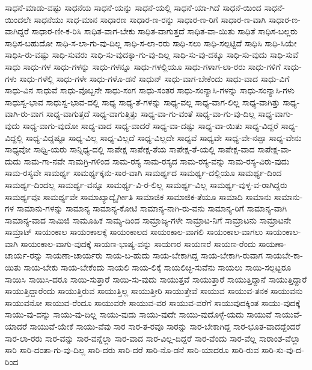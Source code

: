 {ಸಾಧನೆ-ಮಾಡು-ವಷ್ಟು
ಸಾಧನೆಯ
ಸಾಧನೆ-ಯನ್ನು
ಸಾಧನೆ-ಯಲ್ಲಿ
ಸಾಧನೆ-ಯಾ-ಗಿದೆ
ಸಾಧನೆ-ಯಿಂದ
ಸಾಧನೆ-ಯಿಂದಲೇ
ಸಾಧನೆಯು
ಸಾಧ-ಮಾನ
ಸಾಧಾರಣ
ಸಾಧಾರ-ಣ-ರನ್ನು
ಸಾಧಾರ-ಣ-ರಿಗೆ
ಸಾಧಾರ-ಣ-ವಾಗಿ
ಸಾಧಾರ-ಣ-ವಾಗಿದ್ದರೆ
ಸಾಧಾರ-ಣೀ-ಕ-ರಿಸಿ
ಸಾಧಿತ-ವಾಗ-ಬೇಕು
ಸಾಧಿತ-ವಾಗುತ್ತದೆ
ಸಾಧಿತ-ವಾ-ಯಿತು
ಸಾಧಿತೆ
ಸಾಧಿಸ-ಬಲ್ಲರು
ಸಾಧಿಸ-ಬಹುದೋ
ಸಾಧಿ-ಸ-ಲಾ-ಗು-ವು-ದಿಲ್ಲ
ಸಾಧಿ-ಸ-ಲಾ-ರರು
ಸಾಧಿ-ಸಲು
ಸಾಧಿ-ಸಲ್ಪಟ್ಟಿದೆ
ಸಾಧಿಸಿ
ಸಾಧಿ-ಸಿಯೇ
ಸಾಧಿಸಿ-ರು-ವಷ್ಟು
ಸಾಧಿ-ಸುವರು
ಸಾಧಿ-ಸು-ವುದಕ್ಕಾ-ಗು-ವು-ದಿಲ್ಲ
ಸಾಧಿ-ಸು-ವು-ದಕ್ಕೂ
ಸಾಧಿ-ಸು-ವುದು
ಸಾಧಿ-ಸುವೆ
ಸಾಧು
ಸಾಧು-ಗಳ
ಸಾಧು-ಗಳನ್ನು
ಸಾಧು-ಗಳನ್ನೂ
ಸಾಧು-ಗಳಲ್ಲಿಯೂ
ಸಾಧು-ಗಳಾಗ-ಲಾ-ರರು
ಸಾಧು-ಗಳಿಗೆ
ಸಾಧು-ಗಳು
ಸಾಧು-ಗಳೆಲ್ಲಿ
ಸಾಧು-ಗಳೇ
ಸಾಧು-ಗಳೊ-ಡನೆ
ಸಾಧುನ್
ಸಾಧು-ವಾಗ-ಬೇಕೆಂದು
ಸಾಧು-ವಾದ
ಸಾಧು-ವಿಗೆ
ಸಾಧು-ವಿನ
ಸಾಧುವೆ
ಸಾಧು-ವೊಬ್ಬನೇ
ಸಾಧು-ಸಂಗ
ಸಾಧು-ಸಂತರ
ಸಾಧು-ಸಂನ್ಯಾಸಿ-ಗಳನ್ನು
ಸಾಧು-ಸಂನ್ಯಾಸಿ-ಗಳು
ಸಾಧುಸ್ವ-ಭಾವ
ಸಾಧುಸ್ವ-ಭಾವ-ದಲ್ಲಿ
ಸಾಧ್ಯ
ಸಾಧ್ಯ-ತೆ-ಗಳನ್ನು
ಸಾಧ್ಯ-ವಲ್ಲ
ಸಾಧ್ಯ-ವಾಗ-ಲಿಲ್ಲ
ಸಾಧ್ಯ-ವಾಗಿತ್ತು
ಸಾಧ್ಯ-ವಾಗಿ-ರು-ವಾಗ
ಸಾಧ್ಯ-ವಾಗುತ್ತದೆ
ಸಾಧ್ಯ-ವಾಗುತ್ತಿತ್ತು
ಸಾಧ್ಯ-ವಾ-ಗು-ವಂತೆ
ಸಾಧ್ಯ-ವಾ-ಗು-ವು-ದಿಲ್ಲ
ಸಾಧ್ಯ-ವಾಗು-ವುದು
ಸಾಧ್ಯ-ವಾಗು-ವುದೋ
ಸಾಧ್ಯ-ವಾದ
ಸಾಧ್ಯ-ವಾದರೆ
ಸಾಧ್ಯ-ವಾ-ದಷ್ಟು
ಸಾಧ್ಯ-ವಾ-ಯಿತು
ಸಾಧ್ಯ-ವಿದ್ದರೆ
ಸಾಧ್ಯ-ವಿದ್ದಲ್ಲಿ
ಸಾಧ್ಯ-ವಿದ್ದಷ್ಟೂ
ಸಾಧ್ಯ-ವಿಲ್ಲ
ಸಾಧ್ಯ-ವಿಲ್ಲದೆ
ಸಾಧ್ಯ-ವಿಲ್ಲದೇ
ಸಾಧ್ಯವೆ
ಸಾಧ್ಯವೇ
ಸಾಧ್ಯ-ವೇ-ನಪ್ಪಾ
ಸಾಧ್ಯ-ವೇನು
ಸಾಧ್ಯವೋ
ಸಾಧ್ವಿ-ಯರು
ಸಾನ್ನಿಧ್ಯ-ದಲ್ಲಿ
ಸಾಪೇಕ್ಷ
ಸಾಪೇಕ್ಷ-ತೆಯ
ಸಾಪೇಕ್ಷ-ತೆ-ಯಲ್ಲಿ
ಸಾಪೇಕ್ಷ-ವಾದ
ಸಾಪೇಕ್ಷ-ವಾ-ದುದು
ಸಾಮ-ಗಾ-ನವೇ
ಸಾಮಗ್ರಿ-ಗಳಿಂದ
ಸಾಮ-ರಸ್ಯ
ಸಾಮ-ರಸ್ಯದ
ಸಾಮ-ರಸ್ಯ-ವನ್ನು
ಸಾಮ-ರಸ್ಯ-ವಿರು-ವುದು
ಸಾಮ-ರಸ್ಯವೇ
ಸಾಮರ್ಥ್ಯ
ಸಾಮರ್ಥ್ಯಕ್ಕನು-ಸಾರ-ವಾಗಿ
ಸಾಮರ್ಥ್ಯದ
ಸಾಮರ್ಥ್ಯ-ದಲ್ಲಿಯೂ
ಸಾಮರ್ಥ್ಯ-ದಿಂದ
ಸಾಮರ್ಥ್ಯ-ದಿಂದಲ್ಲ
ಸಾಮರ್ಥ್ಯ-ವನ್ನೂ
ಸಾಮರ್ಥ್ಯ-ವಿ-ರ-ಲಿಲ್ಲ
ಸಾಮರ್ಥ್ಯ-ವಿಲ್ಲ
ಸಾಮರ್ಥ್ಯ-ವುಳ್ಳ-ವ-ರಾಗಿದ್ದರು
ಸಾಮರ್ಥ್ಯವೂ
ಸಾಮರ್ಥ್ಯವೇ
ಸಾಮಾಖ್ಯಾದ್ಯೈರ್ಗೀತಿ
ಸಾಮಾಜಿಕ
ಸಾಮಾಜಿಕ-ತೆಯೂ
ಸಾಮಾದಿ
ಸಾಮಾನು
ಸಾಮಾನು-ಗಳ
ಸಾಮಾನು-ಗಳನ್ನು
ಸಾಮಾನ್ಯ
ಸಾಮಾನ್ಯ-ಕೋಟಿ
ಸಾಮಾನ್ಯ-ನಾಗಿ-ರು-ವನು
ಸಾಮಾನ್ಯ-ರಿಗೆ
ಸಾಮಾನ್ಯ-ವಾಗಿ
ಸಾಮಾನ್ಯ-ವಾದ
ಸಾಮಿಜಿ
ಸಾಮೂಹಿಕ
ಸಾಮ್ಯ-ದಿಂದ
ಸಾಮ್ರಾಜ್ಯ-ಗಳೇ
ಸಾಮ್ರಾಟ-ನಿಗೆ
ಸಾಮ್ರಾಟನು
ಸಾಮ್ರಾಟನೇ
ಸಾಮ್ರಾಟ್
ಸಾಯಂಕಾಲ
ಸಾಯಂಕಾಲಕ್ಕೆ
ಸಾಯಂಕಾಲದ
ಸಾಯಂಕಾಲ-ವಾಗಲಿ
ಸಾಯಂಕಾಲ-ವಾಗಲು
ಸಾಯಂಕಾಲ-ವಾಗಿ
ಸಾಯಂಕಾಲ-ವಾಗು-ವುದಕ್ಕೆ
ಸಾಯಣ-ಭಾಷ್ಯ-ವನ್ನು
ಸಾಯಣರ
ಸಾಯಣರೆ
ಸಾಯಣ-ರೆಂದು
ಸಾಯಣಾ-ಚಾರ್ಯ-ರನ್ನು
ಸಾಯಣಾ-ಚಾರ್ಯರು
ಸಾಯ-ಬ-ಹುದು
ಸಾಯ-ಬೇಕಾಗಿದ್ದ
ಸಾಯ-ಬೇಕಾಗಿ-ರುವಾಗ
ಸಾಯಬೇ-ಕಾ-ಯಿತು
ಸಾಯ-ಬೇಕು
ಸಾಯ-ಬೇಕೆಂದು
ಸಾಯಲಿ
ಸಾಯ-ಲಿಕ್ಕೆ
ಸಾಯಲಿಚ್ಛಿ-ಸುವೆನು
ಸಾಯಲು
ಸಾಯಿ-ಸಲ್ಪಟ್ಟರೂ
ಸಾಯಿಸಿ
ಸಾಯಿಸಿ-ದರೂ
ಸಾಯಿ-ಸುತ್ತಾರೆ
ಸಾಯಿ-ಸು-ವುದು
ಸಾಯುತ್ತವೆ
ಸಾಯುತ್ತಾರೆ
ಸಾಯುತ್ತಿದ್ದಾನೆ
ಸಾಯುತ್ತಿದ್ದಾರೆ
ಸಾಯುತ್ತಿದ್ದಾರೆಂದು
ಸಾಯುತ್ತಿರುವ
ಸಾಯುತ್ತಿಲ್ಲ
ಸಾಯುತ್ತೀರಿ
ಸಾಯುತ್ತೇವೆ
ಸಾಯುವ
ಸಾಯುವ-ತನಕ
ಸಾಯುವನು
ಸಾಯುವನೋ
ಸಾಯುವ-ರೆಂದೂ
ಸಾಯುವರೇ
ಸಾಯುವ-ವರ
ಸಾಯುವ-ವರೆಗೆ
ಸಾಯುವುದಕ್ಕಿಂತ
ಸಾಯು-ವುದಕ್ಕೆ
ಸಾಯು-ವು-ದನ್ನು
ಸಾಯು-ವು-ದಿಲ್ಲ
ಸಾಯು-ವುದು
ಸಾಯು-ವುದೇ
ಸಾಯು-ವುದೊಳ್ಳೆ-ಯದು
ಸಾಯುವೆ
ಸಾಯುವೆ-ಯಾದರೆ
ಸಾಯುವೆ-ಯೇಕೆ
ಸಾಯು-ವೆವು
ಸಾರ
ಸಾರ-ತ-ರವೂ
ಸಾರನ್ನು
ಸಾರ-ಬೇಕಾಗಿದ್ದ
ಸಾರ-ಭೂತ-ವಾದದ್ದೆಂದರೆ
ಸಾರ-ಲಾ-ರರು
ಸಾರ-ವನ್ನು
ಸಾರ-ವನ್ನೆಲ್ಲಾ
ಸಾರ-ವಾದ
ಸಾರ-ವಿಲ್ಲ-ದಿದ್ದರೆ
ಸಾರ-ವೆಂದು
ಸಾರ-ವೆಲ್ಲ
ಸಾರಾಂಶ-ವೆಲ್ಲಾ
ಸಾರಿ
ಸಾರಿ-ದಂತಾ-ಗು-ವು-ದಿಲ್ಲ
ಸಾರಿ-ದರು
ಸಾರಿ-ದರೆ
ಸಾರಿ-ನೊ-ಡನೆ
ಸಾರಿ-ಯಾದರೂ
ಸಾರಿ-ರುವ
ಸಾರಿ-ಸು-ವು-ದ-ರಿಂದ
}

